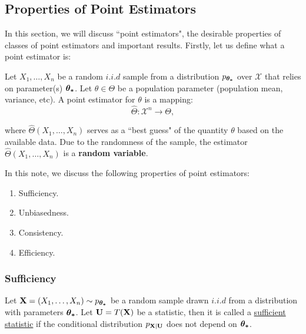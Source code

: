 \newcommand{\FacT}{\hyperref[thm:factorisation_theorem]{(\mathrm{{\bf FacT}})}}

\subsection{Properties of Point Estimators}
In this section, we will discuss ``point estimators", the desirable properties of classes of point estimators and important results. Firstly, let us define what a point estimator is:
\begin{definition}
    Let $X_1, \dots, X_n$ be a random $i.i.d$ sample from a distribution $p_{\boldsymbol{\theta_*}}$ over $\mathcal{X}$ that relies on parameter(s) $\boldsymbol{\theta_*}$. Let $\theta\in\Theta$ be a population parameter (population mean, variance, etc). A point estimator for $\theta$ is a mapping:
    \begin{equation}
        \widehat{\Theta}: \mathcal{X}^n \to \Theta,
    \end{equation}

    \noindent where $\widehat{\Theta}(X_1, \dots, X_n)$ serves as a ``best guess" of the quantity $\theta$ based on the available data. Due to the randomness of the sample, the estimator $\widehat\Theta(X_1, \dots, X_n)$ is a \textbf{random variable}.
\end{definition} 

In this note, we discuss the following properties of point estimators:
\begin{enumerate}
    \item Sufficiency.
    \item Unbiasedness.
    \item Consistency.
    \item Efficiency. 
\end{enumerate} 

\subsubsection{Sufficiency}
\begin{definition}
    Let ${\bf X} = (X_1, \dots, X_n) \sim p_{\boldsymbol{\theta_*}}$ be a random sample drawn $i.i.d$ from a distribution with parameters $\boldsymbol{\theta_*}$. Let ${\bf U}=T({\bf X})$ be a statistic, then it is called a \underline{sufficient statistic} if the conditional distribution $p_{{\bf X}|{\bf U}}$ does not depend on $\boldsymbol{\theta_*}$.
\end{definition}

